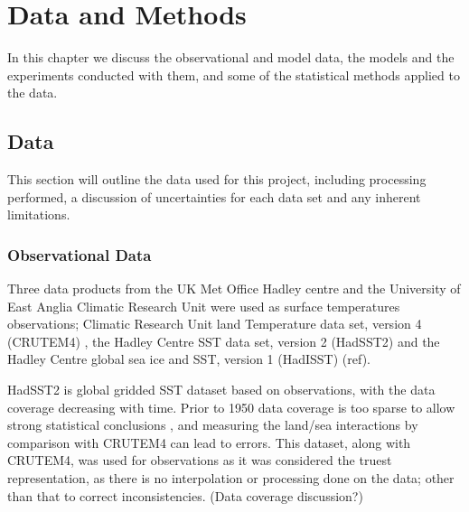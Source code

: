 \chapter{Data and Methods} %

\label{methods} %


In this chapter we discuss the observational and model data, the models and the 
experiments conducted with them, and some of the statistical methods applied to 
the data.


\section{Data}

This section will outline the data used for this project, including processing 
performed, a discussion of uncertainties for each data set and any inherent 
limitations.

\subsection{Observational Data}

Three data products from the UK Met Office Hadley centre and the University of 
East Anglia Climatic Research Unit were used as surface temperatures 
observations; Climatic Research Unit land Temperature data set, version 
4 (CRUTEM4) \citep{Brohan2006}, the Hadley Centre SST data set,
version 2 (HadSST2) \citep{Rayner2006} and the Hadley Centre global sea ice and 
SST, version 1 (HadISST) (ref).

HadSST2 is global gridded SST dataset based on observations, with the data 
coverage decreasing with time. Prior to 1950 data coverage is too sparse to 
allow strong statistical conclusions \citep{Dommenget2009}, and measuring the 
land/sea interactions by comparison with CRUTEM4 can lead to errors. This 
dataset, along with CRUTEM4, was used for observations as it was considered the 
truest representation, as there is no interpolation or processing done on the 
data; other than that to correct inconsistencies. (Data coverage discussion?)

